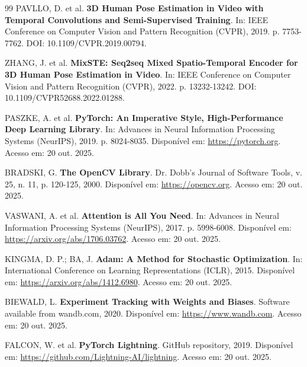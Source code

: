 \documentclass[12pt, a4paper]{article}
\begin{document}
\begin{thebibliography}{99}
PAVLLO, D. et al. \textbf{3D Human Pose Estimation in Video with Temporal Convolutions and Semi-Supervised Training}. In: IEEE Conference on Computer Vision and Pattern Recognition (CVPR), 2019. p. 7753-7762. DOI: 10.1109/CVPR.2019.00794.

ZHANG, J. et al. \textbf{MixSTE: Seq2seq Mixed Spatio-Temporal Encoder for 3D Human Pose Estimation in Video}. In: IEEE Conference on Computer Vision and Pattern Recognition (CVPR), 2022. p. 13232-13242. DOI: 10.1109/CVPR52688.2022.01288.

PASZKE, A. et al. \textbf{PyTorch: An Imperative Style, High-Performance Deep Learning Library}. In: Advances in Neural Information Processing Systems (NeurIPS), 2019. p. 8024-8035. Disponível em: \url{https://pytorch.org}. Acesso em: 20 out. 2025.

BRADSKI, G. \textbf{The OpenCV Library}. Dr. Dobb's Journal of Software Tools, v. 25, n. 11, p. 120-125, 2000. Disponível em: \url{https://opencv.org}. Acesso em: 20 out. 2025.

VASWANI, A. et al. \textbf{Attention is All You Need}. In: Advances in Neural Information Processing Systems (NeurIPS), 2017. p. 5998-6008. Disponível em: \url{https://arxiv.org/abs/1706.03762}. Acesso em: 20 out. 2025.

KINGMA, D. P.; BA, J. \textbf{Adam: A Method for Stochastic Optimization}. In: International Conference on Learning Representations (ICLR), 2015. Disponível em: \url{https://arxiv.org/abs/1412.6980}. Acesso em: 20 out. 2025.

BIEWALD, L. \textbf{Experiment Tracking with Weights and Biases}. Software available from wandb.com, 2020. Disponível em: \url{https://www.wandb.com}. Acesso em: 20 out. 2025.

FALCON, W. et al. \textbf{PyTorch Lightning}. GitHub repository, 2019. Disponível em: \url{https://github.com/Lightning-AI/lightning}. Acesso em: 20 out. 2025.

\end{thebibliography}
\end{document}
